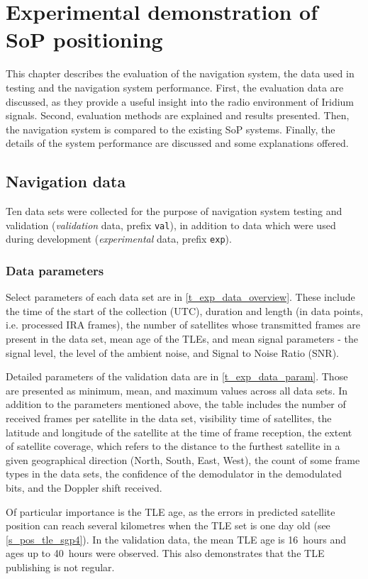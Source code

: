 \chapter{Experimental demonstration of SoP positioning}
\label{s_exp}
This chapter describes the evaluation of the navigation system, the data used in testing and the navigation system performance. First, the evaluation data are discussed, as they provide a useful insight into the radio environment of Iridium signals. Second, evaluation methods are explained and results presented. Then, the navigation system is compared to the existing SoP systems. Finally, the details of the system performance are discussed and some explanations offered.

\section{Navigation data}
Ten data sets were collected for the purpose of navigation system testing and validation (\textit{validation} data, prefix \texttt{val}), in addition to data which were used during development (\textit{experimental} data, prefix \texttt{exp}).


\subsection{Data parameters}
Select parameters of each data set are in \autoref{t_exp_data_overview}. These include the time of the start of the collection (UTC), duration and length (in data points, i.e. processed IRA frames), the number of satellites whose transmitted frames are present in the data set, mean age of the TLEs, and mean signal parameters - the signal level, the level of the ambient noise, and Signal to Noise Ratio (SNR). 

Detailed parameters of the validation data are in \autoref{t_exp_data_param}. Those are presented as minimum, mean, and maximum values across all data sets. In addition to the parameters mentioned above, the table includes the number of received frames per satellite in the data set, visibility time of satellites, the latitude and longitude of the satellite at the time of frame reception, the extent of satellite coverage, which refers to the distance to the furthest satellite in a given geographical direction (North, South, East, West), the count of some frame types in the data sets, the confidence of the demodulator in the demodulated bits, and the Doppler shift received.

Of particular importance is the TLE age, as the errors in predicted satellite position can reach several kilometres when the TLE set is one day old (see \autoref{s_pos_tle_sgp4}). In the validation data, the mean TLE age is \qty{16}{hours} and ages up to \qty{40}{hours} were observed. This also demonstrates that the TLE publishing is not regular.

